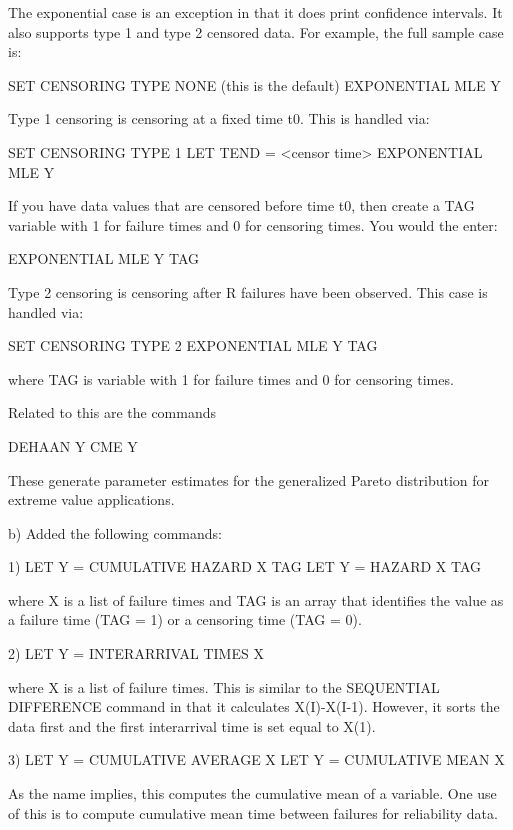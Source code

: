{       The exponential case is an exception in that it does
       print confidence intervals.  It also supports type 1 and
       type 2 censored data.  For example, the full sample case
       is:

           SET CENSORING TYPE NONE    (this is the default)
           EXPONENTIAL MLE Y

       Type 1 censoring is censoring at a fixed time t0.  This
       is handled via:

           SET CENSORING TYPE 1
           LET TEND = <censor time>
           EXPONENTIAL MLE Y

       If you have data values that are censored before time t0, then
       create a TAG variable with 1 for failure times and 0 for
       censoring times.  You would the  enter:

           EXPONENTIAL MLE Y TAG

       Type 2 censoring is censoring after R failures have been
       observed.  This case is handled via:

           SET CENSORING TYPE 2
           EXPONENTIAL MLE Y TAG

       where TAG is variable with 1 for failure times and 0 for
       censoring times.

       Related to this are the commands
   
             DEHAAN Y
             CME Y
   
       These generate parameter estimates for the generalized
       Pareto distribution for extreme value applications.
   
    b) Added the following commands:

       1)   LET Y = CUMULATIVE HAZARD X TAG
            LET Y = HAZARD X TAG
   
          where X is a list of failure times and TAG is an array
          that identifies the value as a failure time (TAG = 1) or
          a censoring time (TAG = 0).
   
       2)   LET Y = INTERARRIVAL TIMES X
   
          where X is a list of failure times.  This is similar to
          the SEQUENTIAL DIFFERENCE command in that it calculates
          X(I)-X(I-1).  However, it sorts the data first and the
          first interarrival time is set equal to X(1).
   
       3)   LET Y = CUMULATIVE AVERAGE X
            LET Y = CUMULATIVE MEAN X
   
          As the name implies, this computes the cumulative mean of
          a variable.  One use of this is to compute cumulative mean
          time between failures for reliability data.
   
}

